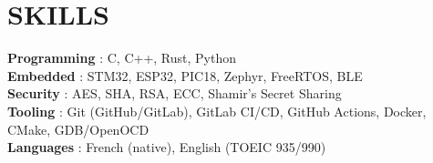 \documentclass[letterpaper,11pt]{article}
\begin{document}
%
\section{SKILLS}
 \begin{itemize}[leftmargin=0in, label={}]
    \small{\item{
        \textbf{Programming} {: C, C++, Rust, Python}\vspace{2pt} \\
     \textbf{Embedded}    {: STM32, ESP32, PIC18, Zephyr, FreeRTOS, BLE}\vspace{2pt} \\
     \textbf{Security}    {: AES, SHA, RSA, ECC, Shamir's Secret Sharing}\vspace{2pt} \\
     \textbf{Tooling}     {: Git (GitHub/GitLab), GitLab CI/CD, GitHub Actions, Docker, CMake, GDB/OpenOCD}\vspace{2pt} \\
     \textbf{Languages}   {: French (native), English (TOEIC 935/990)}
    }}
 \end{itemize}


\end{document}
